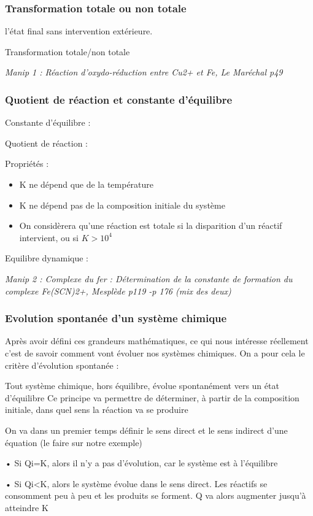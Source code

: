\documentclass{article}%
\begin{document}
\subsubsection{Transformation totale ou non totale}
l’état final sans intervention extérieure.

Transformation totale/non totale

\textit{Manip 1 : Réaction d’oxydo-réduction entre Cu2+ et Fe, Le Maréchal p49}
\subsubsection{Quotient de réaction et constante d'équilibre}
Constante d'équilibre :

Quotient de réaction :

Propriétés :
\begin{itemize}
	\item K ne dépend que de la température
	\item K ne dépend pas de la composition initiale du système
\item On considèrera qu’une réaction est totale si la disparition d’un réactif intervient, ou si $K>10^4$
\end{itemize}
Equilibre dynamique :

\textit{Manip 2 : Complexe du fer : Détermination de la constante de formation du complexe Fe(SCN)2+, Mesplède p119 -p 176 (mix des deux)}

\subsubsection{Evolution spontanée d'un système chimique}

Après avoir défini ces grandeurs mathématiques, ce qui nous intéresse réellement c’est de savoir
comment vont évoluer nos systèmes chimiques. On a pour cela le critère d’évolution spontanée :

Tout système chimique, hors équilibre, évolue spontanément vers un état d’équilibre
Ce principe va permettre de déterminer, à partir de la composition initiale, dans quel sens la réaction
va se produire

On va dans un premier temps définir le sens direct et le sens indirect d’une équation (le faire sur
notre exemple)

• Si Qi=K, alors il n’y a pas d’évolution, car le système est à l’équilibre

• Si Qi<K, alors le système évolue dans le sens direct. Les réactifs se consomment peu à peu
et les produits se forment. Q va alors augmenter jusqu’à atteindre K
\end{document}
